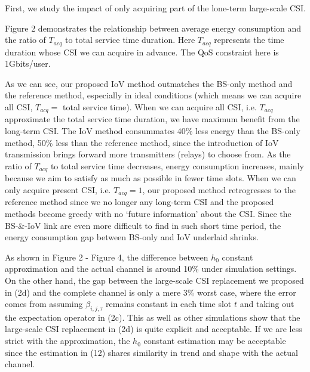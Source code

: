 \documentclass{ieeeaccess}
\begin{document}

First, we study the impact of only acquiring part of the lone-term large-scale CSI. 

Figure 2 demonstrates the relationship between average energy consumption and the ratio of ${T_{acq}}$ to total service time duration. Here ${T_{acq}}$ represents the time duration whose CSI we can acquire in advance. The QoS constraint here is 1Gbits/user. 

As we can see, our proposed IoV method outmatches the BS-only method and the reference method, especially in ideal conditions (which means we can acquire all CSI, ${T_{acq}}=$ total service time). %
When we can acquire all CSI, i.e. ${T_{acq}}$ approximate the total service time duration, we have maximum benefit from the long-term CSI. The IoV method consummates 40\% less energy than the BS-only method, 50\% less than the reference method, since the introduction of IoV transmission brings forward more transmitters (relays) to choose from. As the ratio of ${T_{acq}}$ to total service time decreases, %
energy consumption increases, mainly because we aim to satisfy as much as possible in fewer time slots. When we can only acquire present CSI, i.e. ${T_{acq}} = 1$, our proposed method retrogresses to the reference method since we no longer any long-term CSI and the proposed methods become greedy with no `future information' about the CSI. Since the BS-\&-IoV link are even more difficult to find in such short time period, the energy consumption gap between BS-only and IoV underlaid shrinks.  

As shown in Figure 2 - Figure 4, the difference between ${h_0}$ constant approximation and the actual channel is around 10\% under simulation settings. On the other hand, the gap between the large-scale CSI replacement we proposed in (2d) and the complete channel is only a mere 3\% worst case, where the error comes from assuming $\beta _{i,j,\tau }$ remains constant in each time slot $t$ and taking out the expectation operator in (2c). This as well as other simulations show that the large-scale CSI replacement in (2d) is quite explicit and acceptable. If we are less strict with the approximation, the ${h_0}$ constant estimation may be acceptable since the estimation in (12) shares similarity in trend and shape with the actual channel. 
\end{document}
